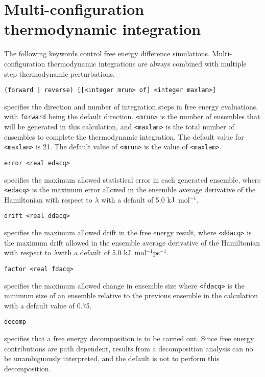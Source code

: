 \section{Multi-configuration thermodynamic integration}
The following keywords control free energy difference simulations.
Multi-configuration thermodynamic integrations are always combined
with multiple step thermodynamic perturbations.
\begin{description}

\item
\begin{verbatim}
(forward | reverse) [[<integer mrun> of] <integer maxlam>]
\end{verbatim}
specifies the direction and number of integration steps in free
energy evaluations, with {\tt forward} being the default direction.
\verb+<mrun>+ is the number of ensembles that will be generated in
this calculation, and \verb+<maxlam>+ is the total number of ensembles
to complete the thermodynamic integration. The default value for 
\verb+<maxlam>+ is 21. The default value of \verb+<mrun>+ is the 
value of \verb+<maxlam>+.

\item
\begin{verbatim}
error <real edacq>
\end{verbatim}
specifies the maximum allowed statistical error in each generated
ensemble, where \verb+<edacq>+ is the maximum error allowed in the 
ensemble average derivative of the Hamiltonian with respect to 
$\lambda$ with a default of 5.0 kJ~mol$^{-1}$.

\item
\begin{verbatim}
drift <real ddacq>
\end{verbatim}
specifies the maximum allowed drift in the free energy result,
where \verb+<ddacq>+ is the maximum drift allowed in the
ensemble average derivative of the Hamiltonian with respect to 
$\lambda$with a default of 5.0 kJ~mol$^{-1}$ps$^{-1}$.

\item
\begin{verbatim}
factor <real fdacq>
\end{verbatim}
specifies the maximum allowed change in ensemble size
where \verb+<fdacq>+ is the minimum size of an ensemble relative to the
previous ensemble in the calculation with a default value of 0.75.

\item
\begin{verbatim}
decomp
\end{verbatim}
specifies that a free energy decomposition is to be carried out.
Since free energy contributions are path dependent, results from a
decomposition analysis can no be unambiguously interpreted, and
the default is not to perform this decomposition.


\end{description}

